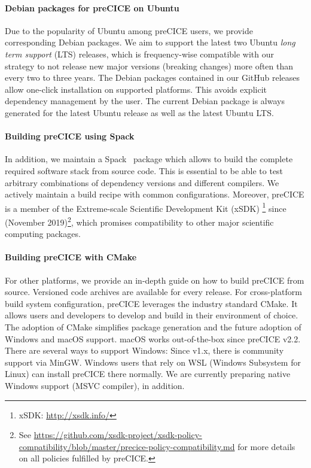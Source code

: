 \paragraph{Debian packages for preCICE on Ubuntu}
Due to the popularity of Ubuntu among preCICE users, we provide corresponding Debian packages.
We aim to support the latest two Ubuntu \textit{long term support} (LTS) releases, which is frequency-wise compatible with our
strategy to not release new major versions (breaking changes) more often than every two to three years.
The Debian packages contained in our GitHub releases allow one-click installation on supported platforms.
This avoids explicit dependency management by the user. The current Debian package is always generated for 
the latest Ubuntu release as well as the latest Ubuntu LTS.

\paragraph{Building preCICE using Spack}
In addition, we maintain a Spack~\cite{spack} package which allows to build the complete required software stack
from source code. 
This is essential to be able to test arbitrary combinations of dependency versions and different compilers.
We actively maintain a build recipe with common
configurations. Moreover, preCICE is a member of the Extreme-scale Scientific Development Kit (xSDK) \footnote{xSDK: \url{http://xsdk.info/}} since  (November 2019)\footnote{See {\scriptsize \url{https://github.com/xsdk-project/xsdk-policy-compatibility/blob/master/precice-policy-compatibility.md}} for more details on all policies fulfilled by preCICE.}, which promises
compatibility to other major scientific computing packages.





\paragraph{Building preCICE with CMake}
For other platforms, we provide an in-depth guide on how to build preCICE from source. Versioned code archives are available for every release.
For cross-platform build system configuration, preCICE leverages the industry standard CMake.
It allows users and developers to develop and build in their environment of choice.
The adoption of CMake simplifies package generation and the future adoption of Windows and macOS support.
macOS works out-of-the-box since preCICE v2.2. There are several ways to support Windows:
Since v1.x, there is community support via MinGW.
Windows users that rely on WSL (Windows Subsystem for Linux) can install preCICE there normally.
We are currently preparing native Windows support (MSVC compiler), in addition. 

